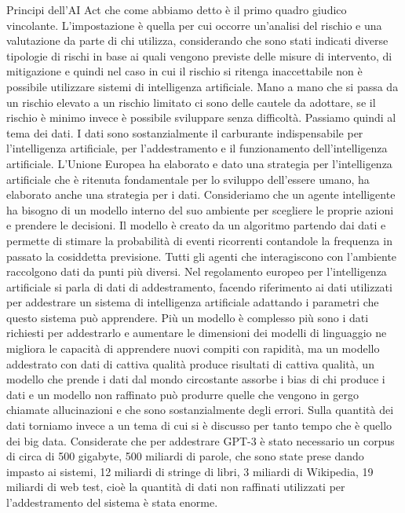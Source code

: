 Principi dell'AI Act che come abbiamo detto è il primo quadro giudico vincolante. L'impostazione è quella per cui occorre un'analisi del rischio e una valutazione da parte di chi utilizza, considerando che sono stati indicati diverse tipologie di rischi in base ai quali vengono previste delle misure di intervento, di mitigazione e quindi nel caso in cui il rischio si ritenga inaccettabile non è possibile utilizzare sistemi di intelligenza artificiale. Mano a mano che si passa da un rischio elevato a un rischio limitato ci sono delle cautele da adottare, se il rischio è minimo invece è possibile sviluppare senza difficoltà.
Passiamo quindi al tema dei dati.
I dati sono sostanzialmente il carburante indispensabile per l'intelligenza artificiale, per l'addestramento e il funzionamento dell'intelligenza artificiale.
L'Unione Europea ha elaborato e dato una strategia per l'intelligenza artificiale che è ritenuta fondamentale per lo sviluppo dell'essere umano, ha elaborato anche una strategia per i dati.
Consideriamo che un agente intelligente ha bisogno di un modello interno del suo ambiente per scegliere le proprie azioni e prendere le decisioni.
Il modello è creato da un algoritmo partendo dai dati e permette di stimare la probabilità di eventi ricorrenti contandole la frequenza in passato la cosiddetta previsione.
Tutti gli agenti che interagiscono con l'ambiente raccolgono dati da punti più diversi.
Nel regolamento europeo per l'intelligenza artificiale si parla di dati di addestramento, facendo riferimento ai dati utilizzati per addestrare un sistema di intelligenza artificiale adattando i parametri che questo sistema può apprendere.
Più un modello è complesso più sono i dati richiesti per addestrarlo e aumentare le dimensioni dei modelli di linguaggio ne migliora le capacità di apprendere nuovi compiti con rapidità, ma un modello addestrato con dati di cattiva qualità produce risultati di cattiva qualità, un modello che prende i dati dal mondo circostante assorbe i bias di chi produce i dati e un modello non raffinato può produrre quelle che vengono in gergo chiamate allucinazioni e che sono sostanzialmente degli errori.
Sulla quantità dei dati torniamo invece a un tema di cui si è discusso per tanto tempo che è quello dei big data.
Considerate che per addestrare GPT-3 è stato necessario un corpus di circa di 500 gigabyte, 500 miliardi di parole, che sono state prese dando impasto ai sistemi, 12 miliardi di stringe di libri, 3 miliardi di Wikipedia, 19 miliardi di web test, cioè la quantità di dati non raffinati utilizzati per l'addestramento del sistema è stata enorme.
